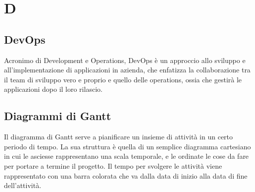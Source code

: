 \section*{D}

\subsection{DevOps}
Acronimo di Development e Operations, DevOps è un approccio allo sviluppo e all’implementazione di applicazioni in azienda, che enfatizza la collaborazione tra il team di sviluppo vero e proprio e quello delle operations, ossia che gestirà le applicazioni dopo il loro rilascio.

\subsection{Diagrammi di Gantt}
Il diagramma di Gantt serve a pianificare un insieme di attività in un certo periodo di tempo. La sua struttura è quella di un semplice diagramma cartesiano in cui le asciesse rappresentano una scala temporale, e le ordinate le cose da fare per portare a termine il progetto. Il tempo per svolgere le attività viene rappresentato con una barra colorata che va dalla data di inizio alla data di fine dell'attività.
